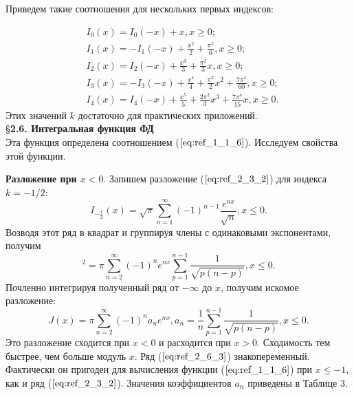 Приведем такие соотношения для нескольких первых индексов:

\begin{equation}
\begin{aligned}
&I_0(x)=I_0(-x)+x,x \geqslant 0; \\
&I_1(x)=-I_1(-x)+\frac{x^2}{2} + \frac{\pi^2}{6},x \geqslant 0;\\
&I_2(x)=I_2(-x)+\frac{x^3}{3} + \frac{\pi^2}{3}x,x \geqslant 0;\\
&I_3(x)=-I_3(-x)+\frac{x^4}{4} + \frac{\pi^2}{2}x^2 + \frac{7\pi^4}{60},x \geqslant 0;\\
&I_4(x)=I_4(-x)+\frac{x^5}{5} + \frac{2\pi^2}{3}x^3 + \frac{7\pi^4}{15}x,x \geqslant 0.
\end{aligned}
\label{eq:ref_2_5_4}
\end{equation}
Этих значений $k$ достаточно для практических приложений.
\\

\S \textbf{2.6. Интегральная функция ФД}
\\

Эта функция определена соотношением ($\ref{eq:ref_1_1_6}$). Исследуем свойства этой функции.

\textbf{Разложение при $x < 0.$} Запишем разложение ($\ref{eq:ref_2_3_2}$) для индекса $k=-1/2$:
\begin{equation}
I_{-\frac{1}{2}}(x)=\sqrt{\pi} \sum\limits_{n=1}^{\infty} (-1)^{n-1} \frac{e^{nx}}{\sqrt{n}},x \leqslant 0.
\label{eq:ref_2_6_1}
\end{equation}
Возводя этот ряд в квадрат и группируя члены с одинаковыми экспонентами, получим
\begin{equation}
[I_{-\frac{1}{2}}(x)]^2 = \pi \sum\limits_{n=2}^{\infty} (-1)^n e^{nx} \sum\limits_{p=1}^{n-1} \frac{1}{\sqrt{p(n-p)}},x \leqslant 0.
\label{eq:ref_2_6_2}
\end{equation}
Почленно интегрируя полученный ряд от $-\infty$ до $x$, получим искомое
разложение:
\begin{equation}
J(x) = \pi \sum\limits_{n=2}^{\infty} (-1)^n a_n e^{nx}, a_n = \frac{1}{n} \sum_{p=1}^{n-1} \frac{1}{\sqrt{p(n-p)}}, x \leqslant 0.
\label{eq:ref_2_6_3}
\end{equation}
Это разложение сходится при $x < 0$ и расходится при $x > 0$. Сходимость тем
быстрее, чем больше модуль $x$. Ряд ($\ref{eq:ref_2_6_3}$) знакопеременный. Фактически он
пригоден для вычисления функции ($\ref{eq:ref_1_1_6}$) при $x \leqslant -1$, как и ряд ($\ref{eq:ref_2_3_2}$). Значения
коэффициентов $a_n$ приведены в Таблице 3.

